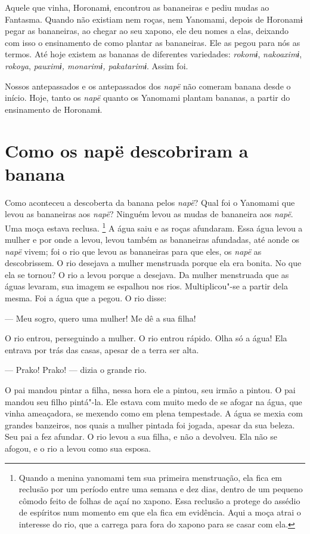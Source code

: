 Aquele que vinha, Horonamɨ, encontrou as bananeiras e pediu mudas ao
Fantasma. Quando não existiam nem roças, nem Yanomami, depois de
Horonamɨ pegar as bananeiras, ao chegar ao seu xapono, ele deu nomes a
elas, deixando com isso o ensinamento de como plantar as bananeiras. Ele
as pegou para nós as termos. Até hoje existem as bananas de diferentes
variedades: \emph{rokomɨ}, \emph{nakoaximɨ}, \emph{rokoya}, \emph{pauximɨ,
monarimɨ, pakatarimɨ}. Assim foi. 

Nossos antepassados e os antepassados dos \emph{napë} não comeram banana
desde o início. Hoje, tanto os \emph{napë} quanto os Yanomami plantam
bananas, a partir do ensinamento de Horonamɨ.

 
\section*{Como os napë descobriram a banana}

Como aconteceu a descoberta da banana pelos \emph{napë}? Qual foi o
Yanomami que levou as bananeiras aos \emph{napë}? Ninguém levou as mudas
de bananeira aos \emph{napë}. Uma moça estava reclusa. \footnote{  Quando a menina yanomami tem sua primeira menstruação, ela fica em
reclusão por um período entre uma semana e dez dias, dentro de um
pequeno cômodo feito de folhas de açaí no xapono. Essa reclusão a
protege do assédio de espíritos num momento em que ela fica em
evidência. Aqui a moça atrai o interesse do rio, que a carrega para fora
do xapono para se casar com ela.} A água saiu
e as roças afundaram. Essa água levou a mulher e por onde a levou, levou
também as bananeiras afundadas, até aonde os \emph{napë} vivem; foi o
rio que levou as bananeiras para que eles, os \emph{napë} as
descobrissem. O rio desejava a mulher menstruada porque ela era bonita.
No que ela se tornou? O rio a levou porque a desejava. Da mulher
menstruada que as águas levaram, sua imagem se espalhou nos rios.
Multiplicou"-se a partir dela mesma. Foi a água que a pegou. O rio
disse: 

--- Meu sogro, quero uma mulher! Me dê a sua filha! 

O rio entrou, perseguindo a mulher. O rio entrou rápido. Olha só a água!
Ela entrava por trás das casas, apesar de a terra ser alta. 

--- Prako! Prako! --- dizia o grande rio. 

O pai mandou pintar a filha, nessa hora ele a pintou, seu irmão a
pintou. O pai mandou seu filho pintá"-la. Ele estava com muito medo de se
afogar na água, que vinha ameaçadora, se mexendo como em plena
tempestade. A água se mexia com grandes banzeiros, nos quais a mulher pintada foi
jogada, apesar da sua beleza. Seu pai a fez afundar. O rio levou a sua filha, e não a devolveu. Ela não se afogou, e o rio a
levou como sua esposa. 


